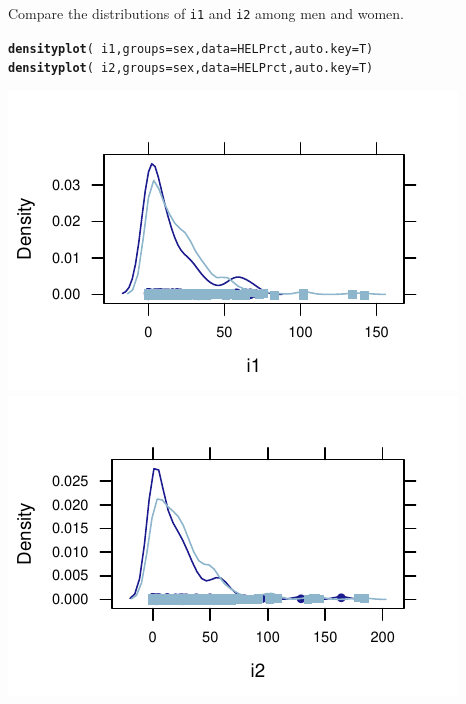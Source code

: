 \documentclass[twoside]{book}\usepackage[]{graphicx}\usepackage[]{xcolor}
\makeatletter
\def\maxwidth{ %
  \ifdim\Gin@nat@width>\linewidth
    \linewidth
  \else
    \Gin@nat@width
  \fi
}
\newcommand{\hlopt}[1]{\textcolor[rgb]{0,0,0}{#1}}%
\newcommand{\hlstd}[1]{\textcolor[rgb]{0.345,0.345,0.345}{#1}}%
\newcommand{\hlkwc}[1]{\textcolor[rgb]{0.333,0.667,0.333}{#1}}%
\newcommand{\hlkwd}[1]{\textcolor[rgb]{0.737,0.353,0.396}{\textbf{#1}}}%
\newenvironment{kframe}{%
 \def\at@end@of@kframe{}%
 \ifinner\ifhmode%
  \def\at@end@of@kframe{\end{minipage}}%
  \begin{minipage}{\columnwidth}%
 \fi\fi%
 \def\FrameCommand##1{\hskip\@totalleftmargin \hskip-\fboxsep
 \colorbox{shadecolor}{##1}\hskip-\fboxsep
     \hskip-\linewidth \hskip-\@totalleftmargin \hskip\columnwidth}%
 \MakeFramed {\advance\hsize-\width
   \@totalleftmargin\z@ \linewidth\hsize
   \@setminipage}}%
 {\par\unskip\endMakeFramed%
 \at@end@of@kframe}
\newenvironment{knitrout}{}{} %
\newcommand{\variable}[1]{{\color{green!50!black}\texttt{#1}}}
\makeatother
\begin{document}
\begin{problem}
	Compare the distributions of \variable{i1} and \variable{i2} among men
	and women.
\end{problem}
\begin{solution}
\begin{knitrout}
\color{fgcolor}\begin{kframe}
\begin{alltt}
\hlkwd{densityplot}\hlstd{(}\hlopt{~}\hlstd{i1,} \hlkwc{groups} \hlstd{= sex,} \hlkwc{data} \hlstd{= HELPrct,} \hlkwc{auto.key} \hlstd{= T)}
\hlkwd{densityplot}\hlstd{(}\hlopt{~}\hlstd{i2,} \hlkwc{groups} \hlstd{= sex,} \hlkwc{data} \hlstd{= HELPrct,} \hlkwc{auto.key} \hlstd{= T)}
\end{alltt}
\end{kframe}

{\centering \includegraphics[width=\maxwidth]{figures/fig-unnamed-chunk-35-1} 
\includegraphics[width=\maxwidth]{figures/fig-unnamed-chunk-35-2} 

}
\end{knitrout}
\end{solution}
\end{document}
